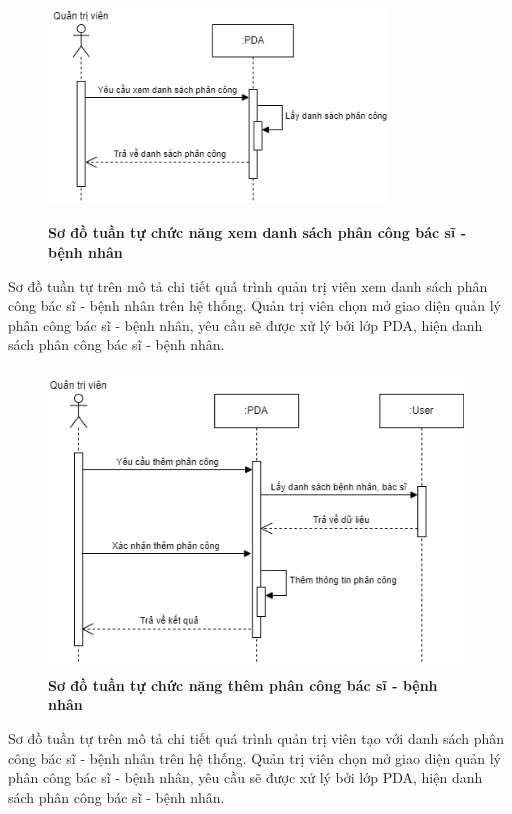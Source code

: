 \begin{figure}[H]
  \centering
  \includegraphics[width=9cm,height=6cm]{Images/sequence/sequence_manage_pda.png}
  \caption[Sơ đồ tuần tự chức năng xem danh sách phân công bác sĩ - bệnh nhân]{\bfseries \fontsize{12pt}{0pt}
  \selectfont Sơ đồ tuần tự chức năng xem danh sách phân công bác sĩ - bệnh nhân}
  \label{sequence_manage_pda} %
\end{figure}
Sơ đồ tuần tự trên mô tả chi tiết quá trình quản trị viên xem danh sách phân công bác sĩ - bệnh nhân trên hệ thống. Quản trị viên chọn mở giao diện
quản lý phân công bác sĩ - bệnh nhân, yêu cầu sẽ được xử lý bởi lớp PDA, hiện danh sách phân công bác sĩ - bệnh nhân. 

\begin{figure}[H]
  \centering
  \includegraphics[width=11cm,height=8cm]{Images/sequence/sequence_manage_add_pda.png}
  \caption[Sơ đồ tuần tự chức năng thêm phân công bác sĩ - bệnh nhân]{\bfseries \fontsize{12pt}{0pt}
  \selectfont Sơ đồ tuần tự chức năng thêm phân công bác sĩ - bệnh nhân}
  \label{sequence_manage_add_pda} %
\end{figure}
Sơ đồ tuần tự trên mô tả chi tiết quá trình quản trị viên tạo với danh sách phân công bác sĩ - bệnh nhân trên hệ thống. Quản trị viên chọn mở giao diện
quản lý phân công bác sĩ - bệnh nhân, yêu cầu sẽ được xử lý bởi lớp PDA, hiện danh sách phân công bác sĩ - bệnh nhân. 

